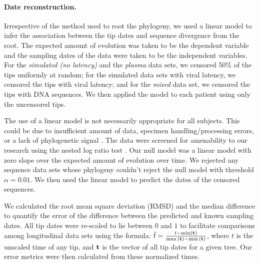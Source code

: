 \documentclass{bmcart}
\begin{document}
\paragraph * {Date reconstruction.} \label{subsec:daterecon}

Irrespective of the method used to root the phylogeny, we used a linear model to infer the association between the tip dates and sequence divergence from the root. 
The expected amount of evolution was taken to be the dependent variable and the sampling dates of the data were taken to be the independent variables.
For the \emph{simulated (no latency)} and the \emph{plasma} data sets, we censored 50\% of the tips uniformly at random; for the simulated data sets with viral latency, we censored the tips with viral latency; and for the \emph{mixed} data set, we censored the tips with DNA sequences.
We then applied the model to each patient using only the uncensored tips.

The use of a linear model is not necessarily appropriate for all subjects.
This could be due to insufficient amount of data, specimen handling/processing errors, or a lack of phylogenetic signal \cite{Tempest}.
The data were screened for amenability to our research using the nested log ratio test \cite{Ho14}. 
Our null model was a linear model with zero slope over the expected amount of evolution over time.
We rejected any sequence data sets whose phylogeny couldn't reject the null model with threshold $\alpha=0.01$.
We then used the linear model to predict the dates of the censored sequences.

We calculated the root mean square deviation (RMSD) and the median difference to quantify the error of the difference between the predicted and known sampling dates.
All tip dates were re-scaled to lie between $0$ and $1$ to facilitate comparisons among longitudinal data sets using the formula: $\hat{t} = \frac{t - \min(\bf{t}) }{ \max{(\bf{t})} - \min{(\bf{t}})}$, where $t$ is the unscaled time of any tip, and $\bf{t}$ is the vector of all tip dates for a given tree. 
Our error metrics were then calculated from these normalized times.%
\end{document}

